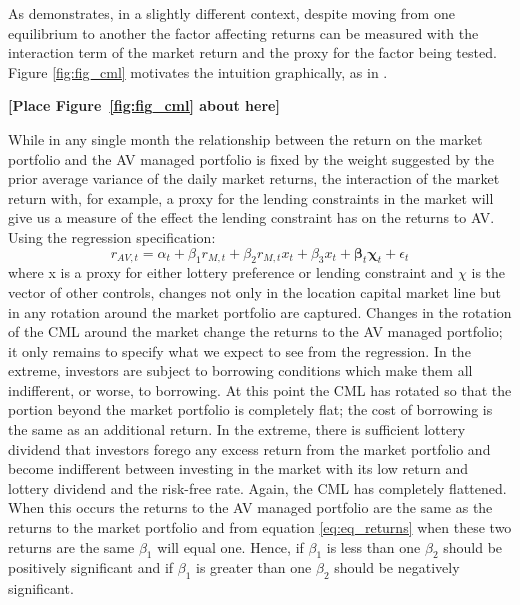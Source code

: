 As \citet{bresnahan_oligopoly_1982} demonstrates, in a slightly different context, despite moving from one equilibrium to another the factor affecting returns can be measured with the interaction term of the market return and the proxy for the factor being tested. Figure \ref{fig:fig_cml} motivates the intuition graphically, as in \citet{bresnahan_oligopoly_1982}.
\bigskip
\centerline{\bf [Place Figure~\ref{fig:fig_cml} about here]}
\bigskip
While in any single month the relationship between the return on the market portfolio and the AV managed portfolio is fixed by the weight suggested by the prior average variance of the daily market returns, the interaction of the market return with, for example, a proxy for the lending constraints in the market will give us a measure of the effect the lending constraint has on the returns to AV. Using the regression specification:
\begin{equation}
		r_{AV,t} = \alpha_{t} + \beta_{1} r_{M,t} + \beta_{2} r_{M,t}x_{t} + \beta_{3}x_{t} + \boldsymbol{\beta}_{t}\boldsymbol{\chi}_{t} + \epsilon_{t}
\end{equation}
where x is a proxy for either lottery preference or lending constraint and $\chi$ is the vector of other controls, changes not only in the location capital market line but in any rotation around the market portfolio are captured. Changes in the rotation of the CML around the market change the returns to the AV managed portfolio; it only remains to specify what we expect to see from the regression. In the extreme, investors are subject to borrowing conditions which make them all indifferent, or worse, to borrowing. At this point the CML has rotated so that the portion beyond the market portfolio is completely flat; the cost of borrowing is the same as an additional return. In the extreme, there is sufficient lottery dividend that investors forego any excess return from the market portfolio and become indifferent between investing in the market with its low return and lottery dividend and the risk-free rate. Again, the CML has completely flattened. When this occurs the returns to the AV managed portfolio are the same as the returns to the market portfolio and from equation \ref{eq:eq_returns} when these two returns are the same $\beta_{1}$ will equal one. Hence, if $\beta_{1}$ is less than one $\beta_{2}$ should be positively significant and if $\beta_{1}$ is greater than one $\beta_{2}$ should be negatively significant.